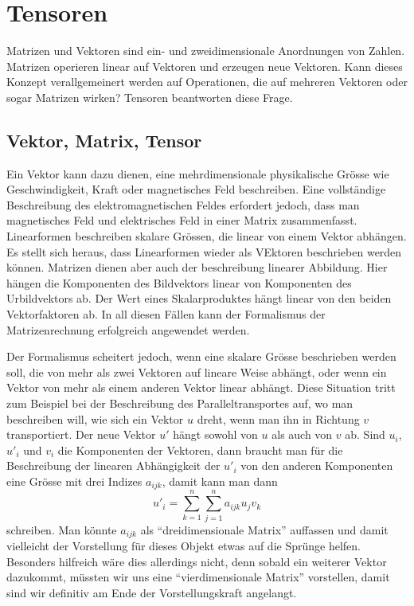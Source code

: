 %
%
%
\chapter{Tensoren}
Matrizen und Vektoren sind ein- und zweidimensionale Anordnungen von
Zahlen.
Matrizen operieren linear auf Vektoren und erzeugen neue Vektoren.
Kann dieses Konzept verallgemeinert werden auf Operationen, die
auf mehreren Vektoren oder sogar Matrizen wirken?
Tensoren beantworten diese Frage.

\section{Vektor, Matrix, Tensor}
Ein Vektor kann dazu dienen, eine mehrdimensionale physikalische
Grösse wie Geschwindigkeit, Kraft oder magnetisches Feld beschreiben.
Eine vollständige Beschreibung des elektromagnetischen Feldes erfordert
jedoch, dass man magnetisches Feld und elektrisches Feld in einer
Matrix zusammenfasst.
Linearformen beschreiben skalare Grössen, die linear von einem 
Vektor abhängen.
Es stellt sich heraus, dass Linearformen wieder als VEktoren beschrieben
werden  können.
Matrizen dienen aber auch der beschreibung linearer Abbildung.
Hier hängen die Komponenten des Bildvektors linear von Komponenten
des Urbildvektors ab.
Der Wert eines Skalarproduktes hängt linear von den beiden Vektorfaktoren ab.
In all diesen Fällen kann der Formalismus der Matrizenrechnung erfolgreich
angewendet werden.

Der Formalismus scheitert jedoch, wenn eine skalare Grösse beschrieben
werden soll, die von mehr als zwei Vektoren auf lineare Weise abhängt,
oder wenn ein Vektor von mehr als einem anderen Vektor linear abhängt.
Diese Situation tritt zum Beispiel bei der Beschreibung des
Paralleltransportes auf, wo man beschreiben will, wie sich ein Vektor 
$u$ dreht, wenn man ihn in Richtung $v$ transportiert.
Der neue Vektor $u'$ hängt sowohl von $u$ als auch von $v$ ab.
Sind $u_i$, $u'_i$ und $v_i$ die Komponenten der Vektoren, dann
braucht man für die Beschreibung der linearen Abhängigkeit der $u'_i$
von den anderen Komponenten eine Grösse mit drei Indizes $a_{ijk}$,
damit kann man dann
\begin{equation}
u'_i = \sum_{k=1}^n\sum_{j=1}^n a_{ijk}u_jv_k
\label{tensor:beispiel:summe}
\end{equation}
schreiben.
Man könnte $a_{ijk}$ als ``dreidimensionale Matrix'' auffassen und
damit vielleicht der Vorstellung für dieses Objekt etwas auf die Sprünge
helfen.
Besonders hilfreich wäre dies allerdings nicht, denn sobald ein weiterer
Vektor dazukommt, müssten wir uns eine ``vierdimensionale Matrix''
vorstellen, damit sind wir definitiv am Ende der Vorstellungskraft
angelangt.

